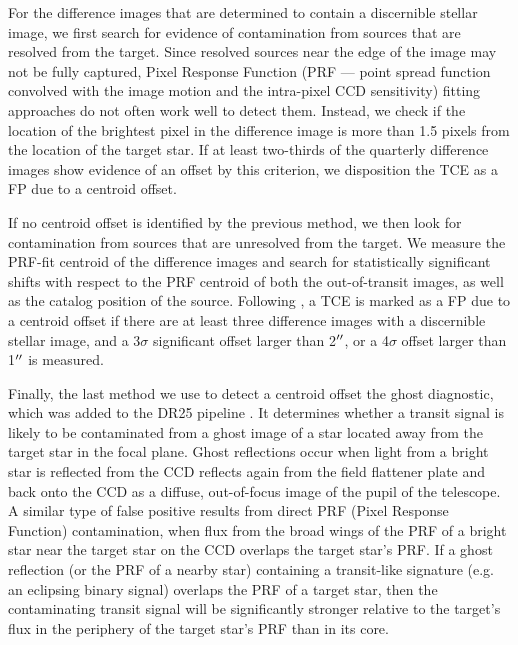 For the difference images that are determined to contain a discernible stellar image, we first search for evidence of contamination from sources that are resolved from the target. Since resolved sources near the edge of the image may not be fully captured, Pixel Response Function (PRF --- \keplers{} point spread function convolved with the image motion and the intra-pixel CCD sensitivity) fitting approaches do not often work well to detect them. Instead, we check if the location of the brightest pixel in the difference image is more than 1.5 pixels from the location of the target star. If at least two-thirds of the quarterly difference images show evidence of an offset by this criterion, we disposition the TCE as a FP due to a centroid offset. %

If no centroid offset is identified by the previous method, we then look for contamination from sources that are unresolved from the target. We measure the PRF-fit centroid of the difference images and search for statistically significant shifts with respect to the PRF centroid of both the out-of-transit images, as well as the catalog position of the source. Following \citet{Bryson2013}, a TCE is marked as a FP due to a centroid offset if there are at least three difference images with a discernible stellar image, and a 3$\sigma$ significant offset larger than 2$\mbox{$^{\prime\prime}$}$, or a 4$\sigma$ offset larger than 1$\mbox{$^{\prime\prime}$}$ is measured.

Finally, the last method we use to detect a centroid offset the ghost diagnostic, which was added to the DR25 \kepler{} pipeline \citep{Twicken2016}. It determines whether a transit signal is likely to be contaminated from a ghost image of a star located away from the target star in the focal plane. Ghost reflections occur when light from a bright star is reflected from the CCD reflects again from the field flattener plate and back onto the CCD as a diffuse, out-of-focus image of the pupil of
the telescope. A similar type of false positive results from direct PRF (Pixel Response Function) contamination, when flux from the broad wings of the PRF of a bright star near the target star on the CCD overlaps the target star's PRF.  If a ghost reflection (or the PRF of a nearby star) containing a transit-like signature (e.g. an eclipsing binary signal) overlaps the PRF of a target star, then the contaminating transit signal will be significantly stronger relative to the target's flux in the periphery of the target star's PRF than in its core.


